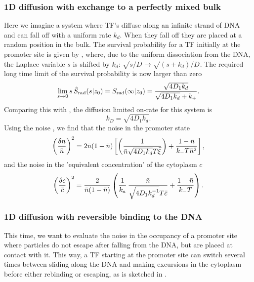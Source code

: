 \subsubsection{1D diffusion with exchange to a perfectly mixed bulk}
Here we imagine a system where TF's diffuse along an infinite strand of DNA and can fall off with a uniform rate $k_d$. When they fall off they are placed at a random position in the bulk. The survival probability for a TF initially at the promoter site is given by , where, due to the uniform dissociation from the DNA, the Laplace variable $s$ is shifted by $k_d$: $\sqrt{s/D} \to \sqrt{(s+k_d)/D}$. The required long time limit of the survival probability is now larger than zero
\begin{equation}
 \lim_{s\to0} s \, \hat{S}_{\rm rad}(s|z_0) = S_{\rm rad}(\infty|z_0) = \frac{\sqrt{4 D_1 k_d}}{\sqrt{4 D_1 k_d} + k_+}.
\end{equation}
Comparing this with , the diffusion limited on-rate for this system is
\begin{equation}
k_D = \sqrt{4 D_1 k_d}.
\end{equation}
Using the noise , we find that the noise in the promoter state
\begin{equation}
 \elabel{NoiseProWM}
 \left( \frac{\delta n}{\bar{n}} \right)^2 = 2 \bar{n}(1-\bar{n})\left[\left( \frac{1}{\bar{n} \sqrt{4 D_1 k_d} T \bar{\xi}} \right)+\frac{1-\bar{n}}{k_- T \bar{n}^2} \right],
\end{equation}
and the noise in the 'equivalent concentration' of the cytoplasm $c$
\begin{equation}
 \elabel{NoiseCWM} 
 \left( \frac{\delta c}{\bar{c}} \right)^2 = \frac{2}{\bar{n}(1-\bar{n})} \left( \frac{1}{k_a} \, \frac{\bar{n}}{\sqrt{4 D_1 k_d^{-1}} T \bar{c}} + \frac{1-\bar{n}}{k_- T}  \right).
\end{equation}


\subsubsection{1D diffusion with reversible binding to the DNA}
This time, we want to evaluate the noise in the occupancy of a promoter site where particles do not escape after falling from the DNA, but are placed at contact with it. This way, a TF starting at the promoter site can switch several times between sliding along the DNA and making excursions in the cytoplasm before either rebinding or escaping, as is sketched in . 

